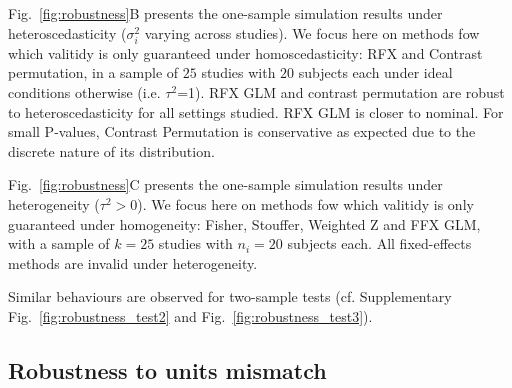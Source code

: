 \documentclass[preprint]{elsarticle}
\newcommand{\nStudies}{k}
\newcommand{\varBetween}{\tau^2}
\newcommand{\nSubjects}[1][i]{n_{#1}}
\newcommand{\varWithin}[1][i]{\sigma^2_{#1}}
\begin{document}



Fig.~\ref{fig:robustness}B presents the one-sample simulation results under heteroscedasticity ($\varWithin$ varying across studies). We focus here on methods fow which valitidy is only guaranteed under homoscedasticity: RFX and Contrast permutation, in a sample of $25$ studies with $20$ subjects each under ideal conditions otherwise (i.e. $\varBetween$=1). RFX GLM and contrast permutation are robust to heteroscedasticity for all settings studied. RFX GLM is closer to nominal. For small P-values, Contrast Permutation is conservative as expected due to the discrete nature of its distribution.

Fig.~\ref{fig:robustness}C presents the one-sample simulation results under heterogeneity ($\varBetween>0$). We focus here on methods fow which valitidy is only guaranteed under homogeneity: Fisher, Stouffer, Weighted Z and FFX GLM, with a sample of $\nStudies=25$ studies with $\nSubjects=20$ subjects each. All fixed-effects methods are invalid under heterogeneity.

Similar behaviours are observed for two-sample tests (cf. Supplementary Fig.~\ref{fig:robustness_test2} and Fig.~\ref{fig:robustness_test3}).

\subsection{Robustness to units mismatch}
\end{document}
